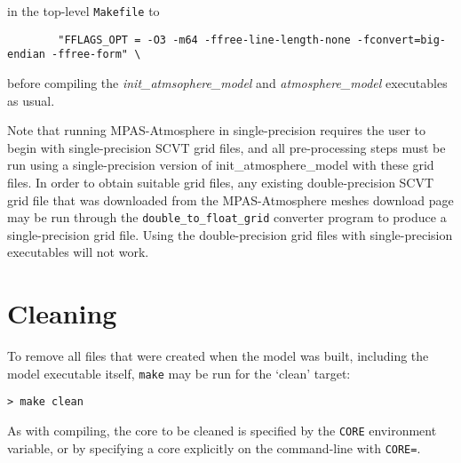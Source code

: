 \noindent in the top-level {\tt Makefile} to

\begin{verbatim}
        "FFLAGS_OPT = -O3 -m64 -ffree-line-length-none -fconvert=big-endian -ffree-form" \
\end{verbatim}

\noindent before compiling the {\em init\_atmsophere\_model} and {\em atmosphere\_model} executables as usual.

Note that running MPAS-Atmosphere in single-precision requires the user to begin with single-precision SCVT grid files, 
and all pre-processing steps must be run using a single-precision version of init\_atmosphere\_model with these grid files. 
In order to obtain suitable grid files, any existing double-precision SCVT grid file that was downloaded from the MPAS-Atmosphere 
meshes download page may be run through the {\tt double\_to\_float\_grid} converter program to produce a single-precision grid file. 
Using the double-precision grid files with single-precision executables will not work.

\section{Cleaning}

To remove all files  that were created when the model was built,
including the model executable itself, {\tt make} may be run for the
`clean' target:

\vspace{12pt}
{\tt > make clean}
\vspace{12pt}

As with compiling, the core to be cleaned is specified by the {\tt CORE}
environment variable, or by specifying a core explicitly on the
command-line with {\tt CORE=}.
